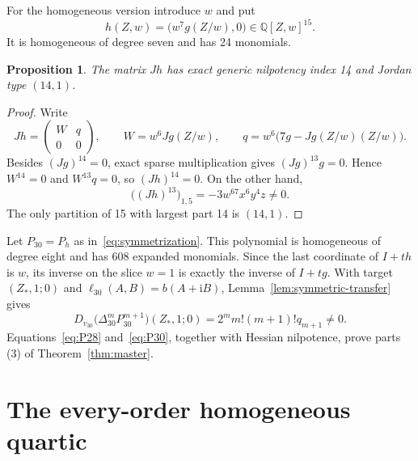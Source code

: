 \documentclass[11pt]{article}
\newtheorem{proposition}[theorem]{Proposition}
\newcommand{\Q}{\mathbb Q}
\newcommand{\ii}{\mathrm i}
\begin{document}
For the homogeneous version introduce $w$ and put
\begin{equation}
 h(Z,w)=\bigl(w^7g(Z/w),0\bigr)\in\Q[Z,w]^{15}.
 \label{eq:h15}
\end{equation}
It is homogeneous of degree seven and has 24 monomials.

\begin{proposition}\label{prop:hindex}
The matrix $Jh$ has exact generic nilpotency index 14 and Jordan type
$(14,1)$.
\end{proposition}

\begin{proof}
Write
\[
 Jh=\begin{pmatrix}W&q\\0&0\end{pmatrix},\qquad
 W=w^6Jg(Z/w),\qquad
 q=w^6\bigl(7g-Jg(Z/w)(Z/w)\bigr).
\]
Besides $(Jg)^{14}=0$, exact sparse multiplication gives
$(Jg)^{13}g=0$.  Hence $W^{14}=0$ and $W^{13}q=0$, so $(Jh)^{14}=0$.
On the other hand,
\[
 \bigl((Jh)^{13}\bigr)_{1,5}=-3w^{67}x^6y^4z\ne0.
\]
The only partition of 15 with largest part 14 is $(14,1)$.
\end{proof}

Let $P_{30}=P_h$ as in~\eqref{eq:symmetrization}.  This polynomial is
homogeneous of degree eight and has 608 expanded monomials.  Since the last
coordinate of $I+th$ is $w$, its inverse on the slice $w=1$ is exactly the
inverse of $I+tg$.  With target $(Z_*,1;0)$ and
$\ell_{30}(A,B)=b(A+\ii B)$, Lemma~\ref{lem:symmetric-transfer} gives
\begin{equation}
 D_{v_{30}}\bigl(\Delta_{30}^mP_{30}^{m+1}\bigr)(Z_*,1;0)
 =2^m m!(m+1)!q_{m+1}\ne0.
 \label{eq:P30}
\end{equation}
Equations~\eqref{eq:P28} and~\eqref{eq:P30}, together with Hessian
nilpotence, prove parts (3) of Theorem~\ref{thm:master}.

\section{The every-order homogeneous quartic}
\end{document}
